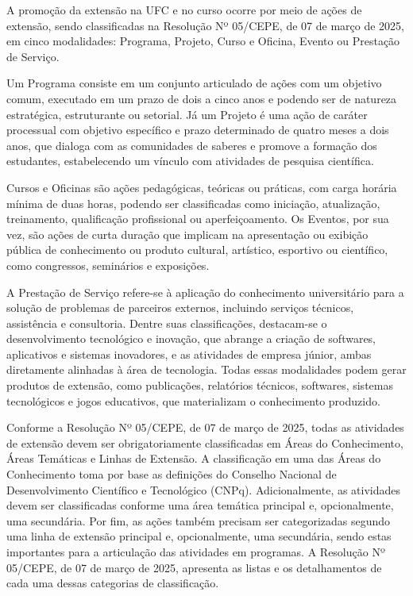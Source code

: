 A promoção da extensão na UFC e no curso ocorre por meio de ações de extensão, sendo classificadas na Resolução Nº 05/CEPE, de 07 de março de 2025, em cinco modalidades: Programa, Projeto, Curso e Oficina, Evento ou Prestação de Serviço. 

Um Programa consiste em um conjunto articulado de ações com um objetivo comum, executado em um prazo de dois a cinco anos e podendo ser de natureza estratégica, estruturante ou setorial. Já um Projeto é uma ação de caráter processual com objetivo específico e prazo determinado de quatro meses a dois anos, que dialoga com as comunidades de saberes e promove a formação dos estudantes, estabelecendo um vínculo com atividades de pesquisa científica.

Cursos e Oficinas são ações pedagógicas, teóricas ou práticas, com carga horária mínima de duas horas, podendo ser classificadas como iniciação, atualização, treinamento, qualificação profissional ou aperfeiçoamento. Os Eventos, por sua vez, são ações de curta duração que implicam na apresentação ou exibição pública de conhecimento ou produto cultural, artístico, esportivo ou científico, como congressos, seminários e exposições.

A Prestação de Serviço refere-se à aplicação do conhecimento universitário para a solução de problemas de parceiros externos, incluindo serviços técnicos, assistência e consultoria. Dentre suas classificações, destacam-se o desenvolvimento tecnológico e inovação, que abrange a criação de softwares, aplicativos e sistemas inovadores, e as atividades de empresa júnior, ambas diretamente alinhadas à área de tecnologia. Todas essas modalidades podem gerar produtos de extensão, como publicações, relatórios técnicos, softwares, sistemas tecnológicos e jogos educativos, que materializam o conhecimento produzido.

Conforme a Resolução Nº 05/CEPE, de 07 de março de 2025, todas as atividades de extensão devem ser obrigatoriamente classificadas em Áreas do Conhecimento, Áreas Temáticas e Linhas de Extensão. A classificação em uma das Áreas do Conhecimento toma por base as definições do Conselho Nacional de Desenvolvimento Científico e Tecnológico (CNPq). Adicionalmente, as atividades devem ser classificadas conforme uma área temática principal e, opcionalmente, uma secundária. Por fim, as ações também precisam ser categorizadas segundo uma linha de extensão principal e, opcionalmente, uma secundária, sendo estas importantes para a articulação das atividades em programas. A Resolução Nº 05/CEPE, de 07 de março de 2025, apresenta as listas e os detalhamentos de cada uma dessas categorias de classificação.

